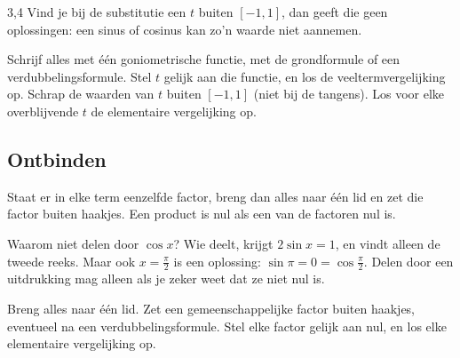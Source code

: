 \begin{alleenvoor}{3,4}
Vind je bij de substitutie een $t$ buiten $[-1, 1]$, dan geeft die geen oplossingen: een sinus of cosinus kan zo'n waarde niet aannemen.

\begin{werkwijze}
Schrijf alles met één goniometrische functie, met de grondformule of een verdubbelingsformule. Stel $t$ gelijk aan die functie, en los de veeltermvergelijking op. Schrap de waarden van $t$ buiten $[-1, 1]$ (niet bij de tangens). Los voor elke overblijvende $t$ de elementaire vergelijking op.
\end{werkwijze}

\begin{oefeningen}
\end{oefeningen}

\subsection{Ontbinden}

Staat er in elke term eenzelfde factor, breng dan alles naar één lid en zet die factor buiten haakjes. Een product is nul als een van de factoren nul is.


Waarom niet delen door $\cos x$? Wie deelt, krijgt $2\sin x = 1$, en vindt alleen de tweede reeks. Maar ook $x = \frac{\pi}{2}$ is een oplossing: $\sin\pi = 0 = \cos\frac{\pi}{2}$. Delen door een uitdrukking mag alleen als je zeker weet dat ze niet nul is.

\begin{werkwijze}
Breng alles naar één lid. Zet een gemeenschappelijke factor buiten haakjes, eventueel na een verdubbelingsformule. Stel elke factor gelijk aan nul, en los elke elementaire vergelijking op.
\end{werkwijze}


\end{alleenvoor}

